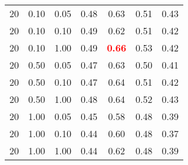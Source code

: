 \begin{tabular}{lllcccc}
20 & 0.10 & 0.05 & 0.48 & 0.63 & 0.51 & 0.43 \\ 
20 & 0.10 & 0.10 & 0.49 & 0.62 & 0.51 & 0.42 \\ 
20 & 0.10 & 1.00 & 0.49 & \textbf{\textcolor{red}{0.66}} & 0.53 & 0.42 \\ 
20 & 0.50 & 0.05 & 0.47 & 0.63 & 0.50 & 0.41 \\ 
20 & 0.50 & 0.10 & 0.47 & 0.64 & 0.51 & 0.42 \\ 
20 & 0.50 & 1.00 & 0.48 & 0.64 & 0.52 & 0.43 \\ 
20 & 1.00 & 0.05 & 0.45 & 0.58 & 0.48 & 0.39 \\ 
20 & 1.00 & 0.10 & 0.44 & 0.60 & 0.48 & 0.37 \\ 
20 & 1.00 & 1.00 & 0.44 & 0.62 & 0.48 & 0.39 \\ 
\end{tabular} 
